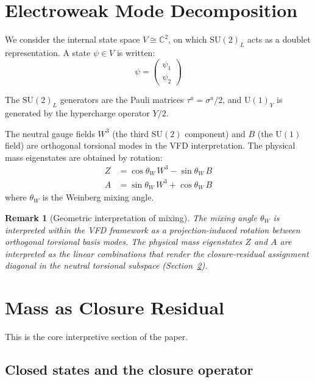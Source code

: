 \documentclass[12pt]{article}
\newtheorem{remark}[theorem]{Remark}
\begin{document}
\section{Electroweak Mode Decomposition}\label{sec:ewmodes}

We consider the internal state space $V \cong \mathbb{C}^2$, on which $\mathrm{SU}(2)_L$ acts as a doublet representation. A state $\psi \in V$ is written:
\begin{equation}
    \psi = \begin{pmatrix} \psi_1 \\ \psi_2 \end{pmatrix}
\end{equation}

The $\mathrm{SU}(2)_L$ generators are the Pauli matrices $\tau^a = \sigma^a/2$, and $\mathrm{U}(1)_Y$ is generated by the hypercharge operator $Y/2$.

The neutral gauge fields $W^3$ (the third $\mathrm{SU}(2)$ component) and $B$ (the $\mathrm{U}(1)$ field) are orthogonal torsional modes in the VFD interpretation. The physical mass eigenstates are obtained by rotation:
\begin{align}
    Z &= \cos\theta_W\, W^3 - \sin\theta_W\, B \label{eq:Zdef} \\
    A &= \sin\theta_W\, W^3 + \cos\theta_W\, B \label{eq:Adef}
\end{align}
where $\theta_W$ is the Weinberg mixing angle.

\begin{remark}[Geometric interpretation of mixing]
The mixing angle $\theta_W$ is interpreted within the VFD framework as a projection-induced rotation between orthogonal torsional basis modes. The physical mass eigenstates $Z$ and $A$ are interpreted as the linear combinations that render the closure-residual assignment diagonal in the neutral torsional subspace (Section~\ref{sec:mass}).
\end{remark}

\section{Mass as Closure Residual}\label{sec:mass}

This is the core interpretive section of the paper.

\subsection{Closed states and the closure operator}
\end{document}
